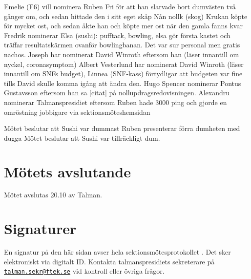 \documentclass[hidelinks]{../sektionsmote} %
\begin{document}
Emelie (F6) vill nominera Ruben Fri för att han slarvade bort dumvästen två gånger om, och sedan hittade den i sitt eget skåp
Nån nollk (skog) Krukan köpte för mycket ost, och sedan åkte han och köpte mer ost när den gamla fanns kvar
Fredrik nominerar Elsa (sushi): pufftack, bowling, elsa gör första kastet och träffar resultatskärmen ovanför bowlingbanan. Det var sur personal men gratis nachos.
Joseph har nominerat David Winroth eftersom han (läser innantill om nyckel, coronasymptom)
Albert Vesterlund har nominerat David Winroth (läser innantill om SNFs budget), Linnea (SNF-kass) förtydligar att budgeten var fine tills David skulle komma igång att ändra den.
Hugo Spencer nominerar Pontus Gustavsson eftersom han sa [citat] på nollupdragsredovisningen.
Alexandru nominerar Talmanspresidiet eftersom Ruben hade 3000 ping och gjorde en omröstning jobbigare via sektionsmöteshemsidan

Mötet beslutar att Sushi var dummast
Ruben presenterar förra dumheten med dugga
Mötet beslutar att Sushi var tillräckligt dum.


\section{Mötets avslutande}
Mötet avslutas 20.10 av Talman.

\clearpage
\section*{Signaturer}
En signatur på den här sidan avser hela sektionsmötesprotokollet \themote. Det sker elektroniskt via digitalt ID. Kontakta talmanspresidiets sekreterare på \href{mailto:talman.sekr@ftek.se}{\texttt{talman.sekr@ftek.se}} vid kontroll eller övriga frågor. 

\vspace{4cm}
\end{document}
